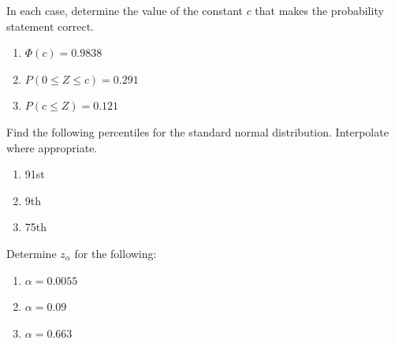 \documentclass[11pt,letterpaper,boxed]{hmcpset}
\begin{document}
{%

\begin{problem}[4.3.29]
	In each case, determine the value of the constant $c$ that makes the probability statement correct.
	\begin{enumerate}
		\item
			$\Phi(c) = 0.9838$
		\item
			$P(0 \leq Z \leq c) = 0.291$
		\item
			$P(c \leq Z) = 0.121$
	\end{enumerate}
\end{problem}

\begin{solution}
	\vfill
\end{solution}
\newpage


\begin{problem}[4.3.30]
	Find the following percentiles for the standard normal distribution.  Interpolate where appropriate.
	\begin{enumerate}
		\item
			91st
		\item
			9th
		\item
			75th
	\end{enumerate}
\end{problem}

\begin{solution}
	\vfill
\end{solution}
\newpage


\begin{problem}[4.3.31]
	Determine $z_\alpha$ for the following:
	\begin{enumerate}
		\item
			$\alpha = 0.0055$
		\item
			$\alpha = 0.09$
		\item
			$\alpha = 0.663$
	\end{enumerate}
\end{problem}

\begin{solution}
	\vfill
\end{solution}
\newpage


}
\end{document}
